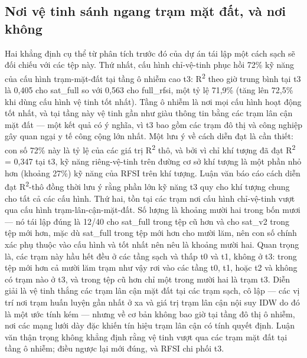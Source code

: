 \subsection{Nơi vệ tinh sánh ngang trạm mặt đất, và nơi không}
Hai khẳng định cụ thể từ phân tích trước đó của dự án tái lập một cách sạch sẽ đối chiếu với các tệp này. Thứ nhất, cấu hình chỉ-vệ-tinh phục hồi 72\% kỹ năng của cấu hình trạm-mặt-đất tại tầng ô nhiễm cao t3: R\textsuperscript{2} theo giờ trung bình tại t3 là 0,405 cho sat\_full so với 0,563 cho full\_rfsi, một tỷ lệ 71,9\% (tăng lên 72,5\% khi dùng cấu hình vệ tinh tốt nhất). Tầng ô nhiễm là nơi mọi cấu hình hoạt động tốt nhất, và tại tầng này vệ tinh gần như giàu thông tin bằng các trạm lân cận mặt đất --- một kết quả có ý nghĩa, vì t3 bao gồm các trạm đô thị và công nghiệp gây quan ngại y tế công cộng lớn nhất. Một lưu ý về cách diễn đạt là cần thiết: con số 72\% này là tỷ lệ của các giá trị R\textsuperscript{2} thô, và bởi vì chỉ khí tượng đã đạt R\textsuperscript{2} = 0,347 tại t3, kỹ năng riêng-vệ-tinh trên đường cơ sở khí tượng là một phần nhỏ hơn (khoảng 27\%) kỹ năng của RFSI trên khí tượng. Luận văn báo cáo cách diễn đạt R\textsuperscript{2}-thô đồng thời lưu ý rằng phần lớn kỹ năng t3 quy cho khí tượng chung cho tất cả các cấu hình.
Thứ hai, tồn tại các trạm nơi cấu hình chỉ-vệ-tinh vượt qua cấu hình trạm-lân-cận-mặt-đất. Số lượng là khoảng mười hai trong bốn mươi --- nó tái lập đúng là 12/40 cho sat\_full trong tệp cũ hơn và cho sat\_v2 trong tệp mới hơn, mặc dù sat\_full trong tệp mới hơn cho mười lăm, nên con số chính xác phụ thuộc vào cấu hình và tốt nhất nên nêu là khoảng mười hai. Quan trọng là, các trạm này hầu hết đều ở các tầng sạch và thấp t0 và t1, không ở t3: trong tệp mới hơn cả mười lăm trạm như vậy rơi vào các tầng t0, t1, hoặc t2 và không có trạm nào ở t3, và trong tệp cũ hơn chỉ một trong mười hai là trạm t3. Diễn giải là vệ tinh thắng các trạm lân cận mặt đất tại các trạm sạch, cô lập --- các vị trí nơi trạm huấn luyện gần nhất ở xa và giá trị trạm lân cận nội suy IDW do đó là một ước tính kém --- nhưng về cơ bản không bao giờ tại tầng đô thị ô nhiễm, nơi các mạng lưới dày đặc khiến tín hiệu trạm lân cận có tính quyết định. Luận văn thận trọng không khẳng định rằng vệ tinh vượt qua các trạm mặt đất tại tầng ô nhiễm; điều ngược lại mới đúng, và RFSI chi phối t3.

